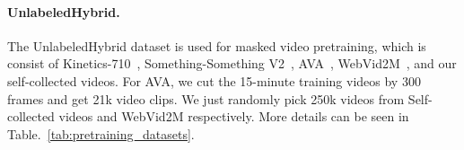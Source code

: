 \paragraph{UnlabeledHybrid.} \label{hybrid}
The UnlabeledHybrid dataset is used for masked video pretraining, which is consist of Kinetics-710~\cite{uniformerv2}, Something-Something V2~\cite{goyal2017something}, AVA~\cite{ava}, WebVid2M~\cite{frozen}, and our self-collected videos. For AVA, we cut the 15-minute training videos by 300 frames and get 21k video clips. We just randomly pick 250k videos from Self-collected videos and WebVid2M respectively. More details can be seen in Table.~\ref{tab:pretraining_datasets}.
